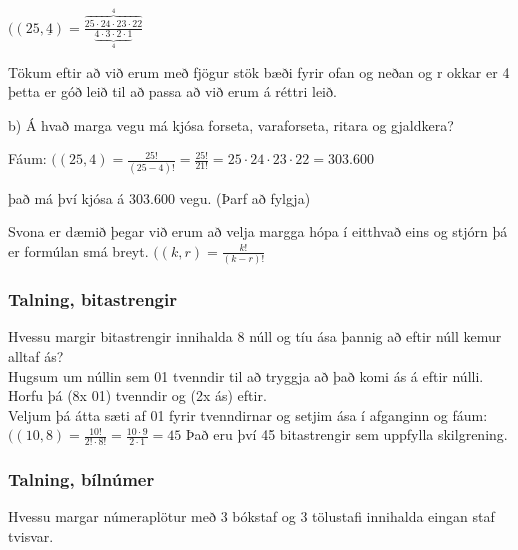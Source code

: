 $((25,\underline{4}) = \frac{\overbrace{25 \cdot 24 \cdot 23 \cdot 22}^4}{\underbrace{4 \cdot 3 \cdot 2 \cdot 1}_4}$\vspace*{0.3em} 

Tökum eftir að við erum með fjögur stök bæði fyrir ofan og neðan og r okkar \hspace*{1.3em}er 4 þetta er góð leið til að passa að við erum á réttri leið.\vspace*{1.5em}

b) Á hvað marga vegu má kjósa forseta, varaforseta, ritara og gjaldkera?\vspace*{0.5em}

Fáum: $((25, 4) = \frac{25!}{(25-4)!} = \frac{25!}{21!} = 25 \cdot 24 \cdot 23 \cdot 22 = 303.600$\vspace*{0.2em}

það má því kjósa á 303.600 vegu. (Þarf að fylgja)\vspace*{0.5em}

Svona er dæmið þegar við erum að velja margga hópa í eitthvað eins og stjórn \hspace*{1.3em}þá er formúlan smá breyt. $((k, r) = \frac{k!}{(k-r)!}$

\newpage
\subsubsection{Talning, bitastrengir}
Hvessu margir bitastrengir innihalda 8 núll og tíu ása þannig að eftir núll kemur alltaf ás?\vspace*{0.5em}\\
Hugsum um núllin sem 01 tvenndir til að tryggja að það komi ás á eftir núlli.\\
Horfu þá (8x 01) tvenndir og (2x ás) eftir.\vspace*{0.5em}\\
Veljum þá átta sæti af 01 fyrir tvenndirnar og setjim ása í afganginn og fáum:\vspace*{0.5em}\\
$((10,8) = \frac{10!}{2!\cdot 8!} = \frac{10 \cdot 9}{2 \cdot 1} = 45$ Það eru því 45 bitastrengir sem uppfylla skilgrening.

\subsubsection{Talning, bílnúmer}
Hvessu margar númeraplötur með 3 bókstaf og 3 tölustafi innihalda eingan staf tvisvar.\vspace*{0.5em}

